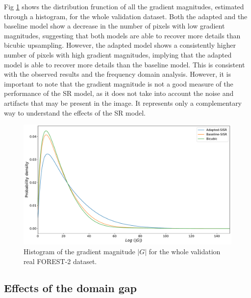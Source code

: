         Fig \ref{fig:5-gradient-histogram-validation-dataset} shows the distribution frunction of all the gradient magnitudes, estimated through a histogram, for the whole validation dataset.
        Both the adapted and the baseline model show a decrease in the number of pixels with low gradient magnitudes, suggesting that both models are able to recover more details than bicubic upsampling.
        However, the adapted model shows a consistently higher number of pixels with high gradient magnitudes, implying that the adapted model is able to recover more details than the baseline model.
        This is consistent with the observed results and the frequency domain analysis. 
        However, it is important to note that the gradient magnitude is not a good measure of the performance of the SR model, as it does not take into account the noise and artifacts that may be present in the image.
        It represents only a complementary way to understand the effects of the SR model.


        \begin{figure}[H]
            \centering
            \includegraphics[scale=0.4]{Includes/5-gradient-histogram-validation-dataset.pdf}
            \caption{Histogram of the gradient magnitude $|G|$ for the whole validation real FOREST-2 dataset.}
            \label{fig:5-gradient-histogram-validation-dataset}
        \end{figure}

    \subsection{Effects of the domain gap}


